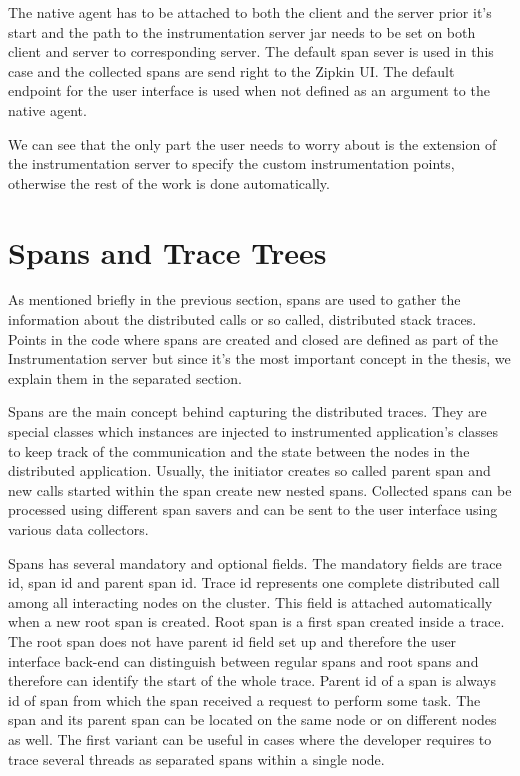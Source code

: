 The native agent has to be attached to both the client and the server prior it's start and the path to the instrumentation server jar needs to be set on both client and server to corresponding server. The default span sever is used in this case and the collected spans are send right to the Zipkin UI. The default endpoint for the user interface is used when not defined as an argument to the native agent.

We can see that the only part the user needs to worry about is the extension of the instrumentation server to specify the custom instrumentation points, otherwise the rest of the work is done automatically.

\section{Spans and Trace Trees}
\label{subsec:spans}
As mentioned briefly in the previous section, spans are used to gather the information about the distributed calls or so called, distributed stack traces. Points in the code where spans are created and closed are defined as part of the Instrumentation server but since it's the most important concept in the thesis, we explain them in the separated section. 

Spans are the main concept behind capturing the distributed traces. They are special classes which instances are injected to instrumented application's classes to keep track of the communication and the state between the nodes in the distributed application. Usually, the initiator creates so called parent span and new calls started within the span create new nested spans. Collected spans can be processed using different span savers and can be sent to the user interface using various data collectors.

Spans has several mandatory and optional fields. The mandatory fields are trace id, span id and parent span id. Trace id represents one complete distributed call among all interacting nodes on the cluster. This field is attached automatically when a new root span is created. Root span is a first span created inside a trace. The root span does not have parent id field set up and therefore the user interface back-end can distinguish between regular spans and root spans and therefore can identify the start of the whole trace. Parent id of a span is always id of span from which the span received a request to perform some task. The span and its parent span can be located on the same node or on different nodes as well. The first variant can be useful in cases where the developer requires to trace several threads as separated spans within a single node.  

